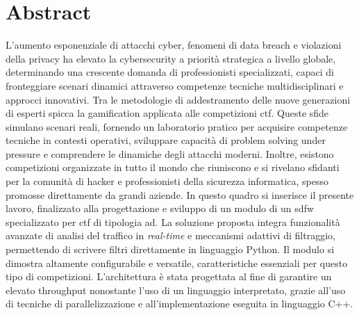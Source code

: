 \chapter*{Abstract}

L'aumento esponenziale di attacchi cyber, fenomeni di data breach e violazioni della privacy ha elevato la cybersecurity a priorità strategica a livello globale, determinando una crescente domanda di professionisti specializzati, capaci di fronteggiare scenari dinamici attraverso competenze tecniche multidisciplinari e approcci innovativi.
Tra le metodologie di addestramento delle nuove generazioni di esperti spicca la gamification applicata alle competizioni \gls{ctf}. Queste sfide simulano scenari reali, fornendo un laboratorio pratico per acquisire competenze tecniche in contesti operativi, sviluppare capacità di problem solving under pressure e comprendere le dinamiche degli attacchi moderni.
Inoltre, esistono competizioni organizzate in tutto il mondo che riuniscono e si rivelano sfidanti per la comunità di hacker e professionisti della sicurezza informatica, spesso promosse direttamente da grandi aziende.
In questo quadro si inserisce il presente lavoro, finalizzato alla progettazione e sviluppo di un modulo di un \gls{sdfw} specializzato per \gls{ctf} di tipologia \gls{ad}. La soluzione proposta integra funzionalità avanzate di analisi del traffico in \textit{real-time} e meccanismi adattivi di filtraggio, permettendo di scrivere filtri direttamente in linguaggio Python.
Il modulo si dimostra altamente configurabile e versatile, caratteristiche essenziali per questo tipo di competizioni. L'architettura è stata progettata al fine di garantire un elevato throughput nonostante l’uso di un linguaggio interpretato, grazie all'uso di tecniche di parallelizzazione e all'implementazione eseguita in linguaggio C++.
